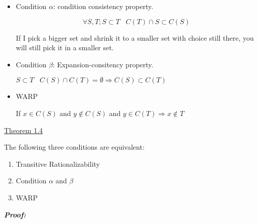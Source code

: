 \documentclass{article}
\begin{document}
\begin{itemize}

\item 
Condition $\alpha$: condition consistency property.

\[
\forall S,T; S\subset T \;\;\;C(T) \cap S \subset C(S)
\]

If I pick a bigger set and shrink it to a smaller set with choice still there, you will still pick it in a smaller set.

\item 
Condition $\beta$: Expansion-consitency property.

$S \subset T  \;\;\; C(S)\cap C(T) = \emptyset \Rightarrow C(S) \subset C(T) $


\item WARP

If $x\in C(S)$ and $y \not \in C(S)$ and $y \in C(T) \Rightarrow x \not \in T$ 

\end{itemize}


\underline{Theorem 1.4}

The following three conditions are equivalent:

\begin{enumerate}

\item Transitive Rationalizability
\item Condition $\alpha$ and $\beta$
\item WARP
\end{enumerate}

\textbf{\emph{Proof:}}


\end{document}
